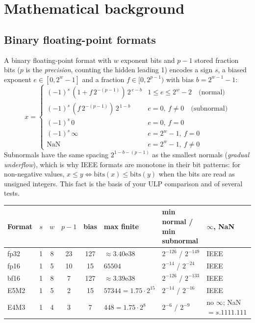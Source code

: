 \section{Mathematical background}

\subsection{Binary floating-point formats}

A binary floating-point format with $w$ exponent bits and $p-1$ stored fraction bits ($p$ is the \emph{precision}, counting the hidden leading 1) encodes a sign $s$, a biased exponent $e\in[0,2^w-1]$ and a fraction $f\in[0,2^{p-1})$ with bias $b = 2^{w-1}-1$:
\begin{equation}
x = \begin{cases}
(-1)^s \,(1 + f\,2^{-(p-1)})\, 2^{\,e-b}            & 1 \le e \le 2^w-2 \quad\text{(normal)}\\
(-1)^s \,(f\,2^{-(p-1)})\, 2^{\,1-b}                   & e = 0,\ f \ne 0 \quad\text{(subnormal)}\\
(-1)^s \, 0                                             & e = 0,\ f = 0\\
(-1)^s \, \infty                                        & e = 2^w-1,\ f = 0\\
\text{NaN}                                              & e = 2^w-1,\ f \ne 0
\end{cases}
\label{eq:ieee}
\end{equation}
Subnormals have the same spacing $2^{1-b-(p-1)}$ as the smallest normals (\emph{gradual underflow}), which is why IEEE formats are monotone in their bit patterns: for non-negative values, $x \le y \iff \text{bits}(x) \le \text{bits}(y)$ when the bits are read as unsigned integers. This fact is the basis of your ULP comparison and of several tests.

\begin{center}\footnotesize
\begin{tabular}{@{}lcccclll@{}}
\toprule
Format & $s$ & $w$ & $p-1$ & bias & max finite & min normal / min subnormal & $\infty$, NaN \\
\midrule
fp32 & 1 & 8  & 23 & 127 & $\approx 3.40\mathrm{e}38$ & $2^{-126}$ / $2^{-149}$ & IEEE \\
fp16 & 1 & 5  & 10 & 15  & $65504$ & $2^{-14}$ / $2^{-24}$ & IEEE \\
bf16 & 1 & 8  & 7  & 127 & $\approx 3.39\mathrm{e}38$ & $2^{-126}$ / $2^{-133}$ & IEEE \\
E5M2 & 1 & 5  & 2  & 15  & $57344 = 1.75\cdot 2^{15}$ & $2^{-14}$ / $2^{-16}$ & IEEE \\
E4M3 & 1 & 4  & 3  & 7   & $448 = 1.75\cdot 2^{8}$ & $2^{-6}$ / $2^{-9}$ & no $\infty$; NaN $=s.1111.111$ \\
\bottomrule
\end{tabular}
\end{center}

